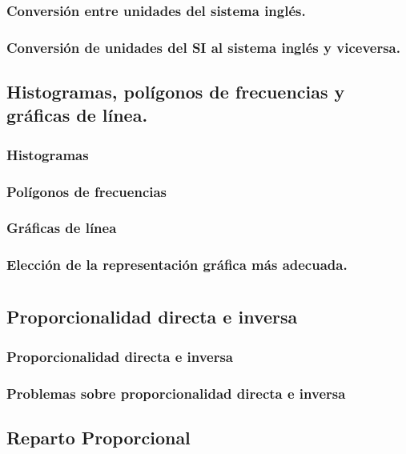 \documentclass[11pt]{book}
\begin{document}
\subsection{Conversión entre unidades del sistema inglés.}
\subsection{Conversión de unidades del SI al sistema inglés y viceversa.}

\section{Histogramas, polígonos de frecuencias y gráficas de línea.}
\subsection{Histogramas}
\subsection{Polígonos de frecuencias}
\subsection{Gráficas de línea}
\subsection{Elección de la representación gráfica más adecuada.}

\chapter{}

\section{Proporcionalidad directa e inversa}
\subsection{Proporcionalidad directa e inversa}
\subsection{Problemas sobre proporcionalidad directa e inversa}

\section{Reparto Proporcional}
\end{document}
